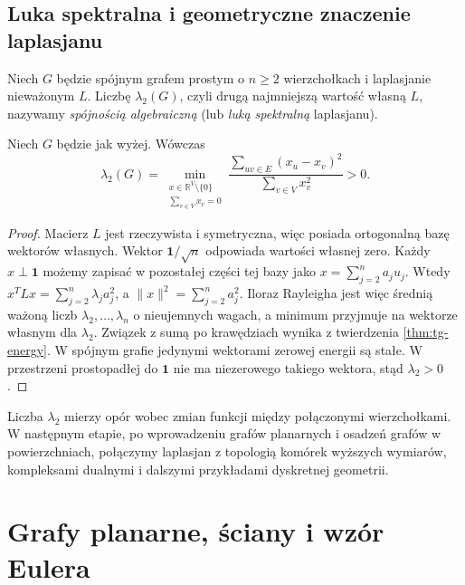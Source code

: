 \section{Luka spektralna i geometryczne znaczenie laplasjanu}
\label{sec:tg-spectral-gap}

\begin{definicja}
Niech $G$ będzie spójnym grafem prostym o $n\ge2$
wierzchołkach i laplasjanie nieważonym $L$.
Liczbę $\lambda_2(G)$, czyli drugą najmniejszą
wartość własną $L$, nazywamy \emph{spójnością algebraiczną}
(lub \emph{luką spektralną} laplasjanu).
\end{definicja}

\begin{twierdzenie}
Niech $G$ będzie jak wyżej. Wówczas
\[
\lambda_2(G)=\min_{\substack{x\in\mathbb R^V\setminus\{0\}\\
               \sum_{v\in V}x_v=0}}
\frac{\sum_{uv\in E}(x_u-x_v)^2}{\sum_{v\in V}x_v^2}>0.
\]
\end{twierdzenie}

\begin{proof}
Macierz $L$ jest rzeczywista i symetryczna, więc posiada
ortogonalną bazę wektorów własnych. Wektor
$\mathbf1/\sqrt n$ odpowiada wartości własnej zero.
Każdy $x\perp\mathbf1$ możemy zapisać w pozostałej
części tej bazy jako $x=\sum_{j=2}^na_ju_j$.
Wtedy $x^TLx=\sum_{j=2}^n\lambda_ja_j^2$,
a $\|x\|^2=\sum_{j=2}^na_j^2$.
Iloraz Rayleigha jest więc średnią ważoną liczb
$\lambda_2,\ldots,\lambda_n$ o nieujemnych wagach,
a minimum przyjmuje na wektorze własnym dla
$\lambda_2$. Związek z sumą po krawędziach wynika
z twierdzenia \ref{thm:tg-energy}.
W spójnym grafie jedynymi wektorami zerowej energii
są stałe. W przestrzeni prostopadłej do $\mathbf1$
nie ma niezerowego takiego wektora, stąd $\lambda_2>0$.
\end{proof}

Liczba $\lambda_2$ mierzy opór wobec zmian funkcji między
połączonymi wierzchołkami. W następnym etapie, po wprowadzeniu
grafów planarnych i osadzeń grafów w powierzchniach,
połączymy laplasjan z topologią komórek wyższych wymiarów,
kompleksami dualnymi i dalszymi przykładami dyskretnej geometrii.

\chapter{Grafy planarne, ściany i wzór Eulera}
\label{ch:tg-planarne}


